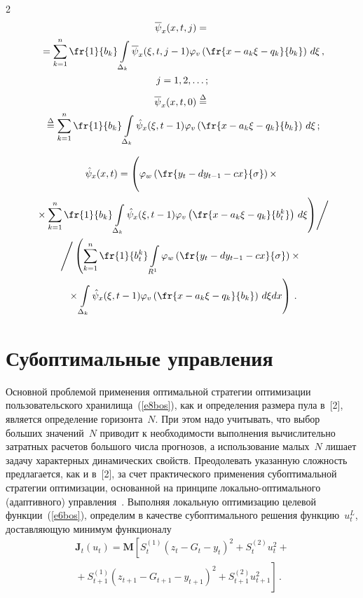 \begin{multicols}{2}
\noindent
\begin{multline*}
\overline{\psi}_x(x,t,j) ={}\\
{}=\sum\limits_{k=1}^n \fr{1}{b_k} \int\limits_{\Delta_k} 
\overline{\psi}_x (\xi, t, j-1)\varphi_v\left( \fr{x-a_k\xi -q_k}{b_k}\right)\,d\xi\,,\\
j=1,2,\ldots;
\end{multline*}
\begin{multline*}
\overline{\psi}_x(x,t,0)\overset{\Delta}{=}{}\\
{}\overset{\Delta}{=} \sum\limits_{k=1}^n \fr{1}{b_k}
\int\limits_{\Delta_k}\hat{\psi}_x(\xi,t-1)\varphi_v\left( \fr{x-a_k\xi-q_k}{b_k}\right)\,d\xi\,;
\end{multline*}

\vspace*{-12pt}

\noindent
\begin{multline*}
\hat{\psi}_x(x,t) = \left(\vphantom{\int\limits_{\Delta_k}}
\varphi_w\left(\fr{y_t-dy_{t-1}-cx}{\sigma}\right)\times\right.\\
\left.{}\times
\sum\limits_{k=1}^n 
\fr{1}{b_k}\int\limits_{\Delta_k} \hat{\psi}_x(\xi,t-1)\varphi_v
\left(\fr{x-a_k\xi-q_k}{b_t^k}\right)\,d\xi\right)\!\Bigg/\\
\Bigg/\left(\sum\limits_{k=1}^n \fr{1}{b_t^k}\int\limits_{R^1} \varphi_w \left(\fr{y_t-dy_{t-1}-
cx}{\sigma}\right)\times{}\right.\\
\left.{}\times\int\limits_{\Delta_k}\hat{\psi}_x(\xi,t-1)\varphi_v
\left(\fr{x-a_k\xi-q_k}{b_k}\right)\,d\xi dx\right)
\,.
\end{multline*}


\section{Субоптимальные управления}
  
  Основной проблемой применения оптимальной стратегии оптимизации пользовательского 
хранилища~(\ref{e8bos}), как и определения размера пула в~[2], является определение 
горизонта~$N$. При этом надо учитывать, что выбор больших значений~$N$ приводит к 
необходимости выполнения вычислительно затратных расчетов большого числа прогнозов, а 
использование малых~$N$ лишает задачу характерных динамических свойств. Преодолевать 
указанную сложность предлагается, как и в~[2], за счет практического применения 
субоптимальной стратегии оптимизации, основанной на принципе локально-оп\-ти\-маль\-но\-го 
(адаптивного) управления~\cite{7bos}. Выполняя локальную оптимизацию целевой 
функции~(\ref{e6bos}), определим в качестве субоптимального решения функцию~$u_t^L$, 
доставляющую минимум функционалу
  \begin{multline*}
  \mathbf{J}_t(u_t)=\mathbf{M}\left[ S_t^{(1)}\left( z_t-G_t-y_t\right)^2 +S_t^{(2)} u_t^2+{}\right.\\
\left.  {}+
  S_{t+1}^{(1)} \left( z_{t+1}-G_{t+1}-y_{t+1}\right)^2 +S_{t+1}^{(2)} u_{t+1}^2\right]\,.
  \end{multline*}
  

\end{multicols}
